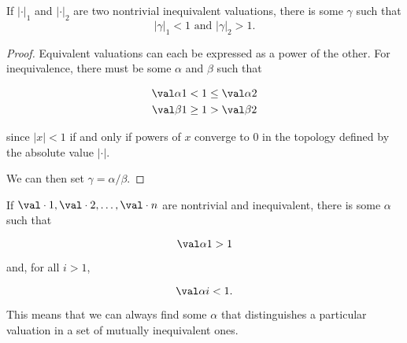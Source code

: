 \begin{lemma}
  If $|\cdot|_1$ and $|\cdot|_2$ are two nontrivial inequivalent valuations, there is
  some $\gamma$ such that \[|\gamma|_1 < 1 \text{ and } |\gamma|_2 > 1.\]
\end{lemma}

\begin{proof}
  Equivalent valuations can each be expressed as a power of the other. For
  inequivalence, there must be some $\alpha$ and $\beta$ such that

  \begin{align*}
    \val \alpha 1 &<    1 \leq \val \alpha 2 \\
    \val \beta 1  &\geq 1 >    \val \beta 2
  \end{align*}

  since $|x|<1$ if and only if powers of $x$ converge to $0$ in the topology
  defined by the absolute value $|\cdot|$.

  We can then set $\gamma = \alpha/\beta$.
\end{proof}

\begin{lemma}
  If $\val \cdot 1, \val \cdot 2, \ldots, \val \cdot n$ are nontrivial and
  inequivalent, there is some $\alpha$ such that

  \[\val \alpha 1 > 1 \]

  and, for all $i > 1$,

  \[ \val \alpha i < 1.\]
\end{lemma}

This means that we can always find some $\alpha$ that distinguishes a particular
valuation in a set of mutually inequivalent ones.

